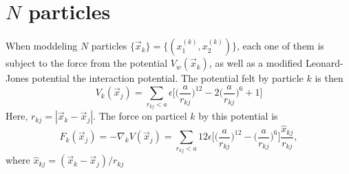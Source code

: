 \documentclass{article}
\begin{document}
    \section*{$N$ particles}
        When moddeling $N$ particles $\{ \vec x_k\} = \{ (x_1^{(k)}, x_2^{(k)}) \}$, each one of them is subject to the force from the potential $V_w(\vec x_k)$, as well as a modified Leonard-Jones potential the interaction potential. The potential felt by particle $k$ is then
        \begin{equation*}
            V_k(\vec x_j) = 
            \sum_{r_{kj}<a}\epsilon \bigg[ \bigg( \frac{a}{r_{kj}}\bigg)^{12} - 2\bigg(\frac{a}{r_{kj}}\bigg)^{6} + 1 \bigg]
        \end{equation*}
        Here, $r_{kj} = |\vec x_k - \vec x_j|$. The force on particel $k$ by this potential is
        \begin{equation*}
            F_k (\vec x_j) = -\nabla_k V(\vec x_j) = \sum_{r_{kj}<a} 12 \epsilon \bigg[ \bigg( \frac{a}{r_{kj}}\bigg)^{12} - \bigg(\frac{a}{r_{kj}}\bigg)^{6}\bigg] \frac{\hat x_{kj}}{r_{kj}},
        \end{equation*}
        where $\hat x_{kj} = (\vec x_k - \vec x_j) / r_{kj}$
\end{document}
